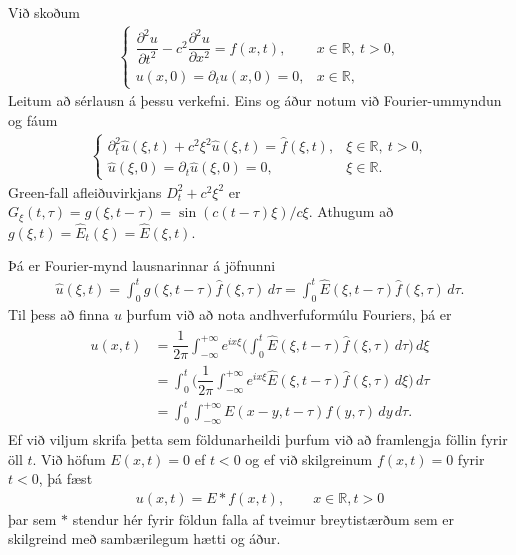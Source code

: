 \documentclass[a4paper,10pt,icelandic]{sphinxmanual}
\begin{document}
Við skoðum
\begin{equation*}
\begin{split}\begin{cases}
\dfrac{\partial^2u}{\partial t^2}
-c^2\dfrac{\partial^2u}{\partial x^2}=f(x,t), &x\in {{\mathbb  R}}, \ t>0,\\
u(x,0)=\partial_tu(x,0)=0, &x\in {{\mathbb  R}},
\end{cases}\end{split}
\end{equation*}
Leitum að sérlausn á þessu verkefni. Eins og áður notum við Fourier-ummyndun og fáum
\begin{equation*}
\begin{split}\begin{cases}
{\partial}_t^2\widehat u({\xi},t)+c^2{\xi}^2
\widehat u({\xi},t)=\widehat f({\xi},t), &{\xi}\in {{\mathbb  R}},\ t>0,\\
\widehat u({\xi},0)={\partial}_t\widehat u({\xi},0)=0, &{\xi}\in {{\mathbb  R}}.
\end{cases}\end{split}
\end{equation*}
Green-fall afleiðuvirkjans \(D_t^2+c^2{\xi}^2\) er \(G_{\xi}(t,{\tau})=g({\xi},t-{\tau})=\sin(c(t-\tau){\xi})/c{\xi}\).
Athugum að \(g(ξ,t)=\widehat E_t({\xi})=\widehat E({\xi},t).\)

Þá er Fourier-mynd lausnarinnar á jöfnunni
\begin{equation*}
\begin{split}\widehat u({\xi},t)
=\int_0^t  g({\xi},t-\tau)\widehat f({\xi},\tau)\, d{\tau}
=\int_0^t\widehat E({\xi},t-\tau)\widehat f({\xi},\tau)\, d{\tau}.\end{split}
\end{equation*}
Til þess að finna \(u\) þurfum við að nota andhverfuformúlu Fouriers, þá er
\begin{equation*}
\begin{split}\begin{aligned}
u(x,t)&
=\dfrac 1{2{\pi}}\int_{-\infty}^{+\infty}e^{ix{\xi}}
\bigg(\int_0^t \widehat E({\xi},t-\tau)\widehat f({\xi},\tau)\, d{\tau}\bigg)
\, d{\xi}\label{15.4.3}\\
&=\int_0^t \bigg(\dfrac 1{2{\pi}}\int_{-\infty}^{+\infty}e^{ix{\xi}}
\widehat E({\xi},t-\tau)\widehat f({\xi},\tau)\, d{\xi}\bigg)
\, d{\tau}\nonumber\\
&=\int_0^t \int_{-\infty}^{+\infty}
E(x-y,t-\tau)f(y,\tau)\, dy\, d{\tau}.\nonumber\end{aligned}\end{split}
\end{equation*}
Ef við viljum skrifa þetta sem földunarheildi þurfum við að framlengja föllin fyrir öll \(t\). Við höfum \(E(x,t) = 0\) ef \(t < 0\) og ef við skilgreinum \(f(x,t) = 0\) fyrir \(t < 0\), þá fæst
\begin{equation*}
\begin{split}u(x,t) = E\ast f(x,t), \qquad x\in\mathbb{R}, t>0\end{split}
\end{equation*}
þar sem \(\ast\) stendur hér fyrir földun falla af tveimur breytistærðum sem er skilgreind með sambærilegum hætti og áður.
\end{document}
